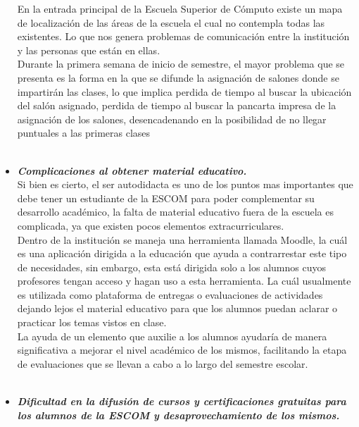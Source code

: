 \begin{itemize}
		En la entrada principal de la Escuela Superior de Cómputo existe un mapa de localización de las áreas de la escuela el cual no contempla todas las existentes.  Lo que nos genera problemas de comunicación entre la institución y las personas que están en ellas. \\ 
		
		 Durante la primera semana de inicio de semestre, el mayor problema que se presenta es la forma en la que se difunde la asignación de salones donde se impartirán las clases, lo que implica perdida de tiempo al buscar la ubicación del salón asignado, perdida de tiempo al buscar la pancarta impresa de la asignación de los salones, desencadenando en la posibilidad de no llegar puntuales a las primeras clases\\ \\
		
		\item \textbf{\textit{Complicaciones al obtener material educativo.}} \\
		
		Si bien es cierto, el ser autodidacta es uno de los puntos mas importantes que debe tener un estudiante de la ESCOM para poder complementar su desarrollo académico, la falta de material educativo fuera de la escuela es complicada, ya que existen pocos elementos extracurriculares.\\
		
		Dentro de la institución se maneja una herramienta llamada Moodle, la cuál es una aplicación dirigida a la educación que ayuda a contrarrestar este tipo de necesidades, sin embargo, esta está dirigida solo a los alumnos cuyos profesores tengan acceso y hagan uso a esta herramienta. La cuál usualmente es utilizada como plataforma de entregas o evaluaciones de actividades dejando lejos el material educativo para que los alumnos puedan aclarar o practicar los temas vistos en clase. \\
		
		La ayuda de un elemento que auxilie a los alumnos ayudaría de manera significativa a mejorar el nivel académico de los mismos, facilitando la etapa de evaluaciones que se llevan a cabo a lo largo del semestre escolar.\\ \\
		
		\item \textbf{\textit{Dificultad en la  difusión de cursos y certificaciones gratuitas para los alumnos de la ESCOM y desaprovechamiento de los mismos.}}\\
		

\end{itemize}
